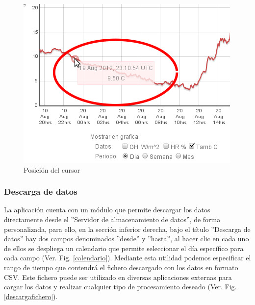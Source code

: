 \begin{figure}[ht]
\begin{minipage}[b]{0.32\linewidth}
        \end{minipage}
	\begin{minipage}[b]{0.32\linewidth}
                \centering
                \includegraphics[scale=0.35]{./images/cap5chap1img4-3}
        \end{minipage}
	\caption{Posición del cursor}
	\label{cursor}
\end{figure}

\newpage
\subsubsection{Descarga de datos}
La aplicación cuenta con un módulo que permite descargar los datos directamente desde el ''Servidor de almacenamiento de datos'', de forma personalizada, para ello, en la sección inferior derecha, bajo el título ''Descarga de datos'' hay dos campos denominados ''desde'' y ''hasta'', al hacer clic en cada uno de ellos se despliega un calendario que permite seleccionar el día específico para cada campo (Ver. Fig. \ref{calendario}). Mediante esta utilidad podemos especificar el rango de tiempo que contendrá el fichero descargado con los datos en formato CSV. Este fichero puede ser utilizado en diversas aplicaciones externas para cargar los datos y realizar cualquier tipo de procesamiento deseado (Ver. Fig. \ref{descargafichero}).


